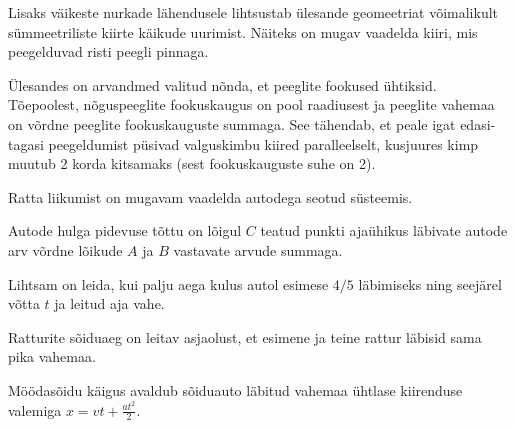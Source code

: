 \documentclass[10pt]{article}
\begin{document}
{
\hint
Lisaks väikeste nurkade lähendusele lihtsustab ülesande geomeetriat võimalikult sümmeetriliste kiirte käikude uurimist. Näiteks on mugav vaadelda kiiri, mis peegelduvad risti peegli pinnaga.
\probend
\bigskip


\hint
Ülesandes on arvandmed valitud nõnda, et peeglite fookused ühtiksid. Tõepoolest, nõguspeeglite fookuskaugus on pool raadiusest ja peeglite vahemaa on võrdne peeglite fookuskauguste summaga. See tähendab, et peale igat edasi-tagasi peegeldumist püsivad valguskimbu kiired paralleelselt, kusjuures kimp muutub 2 korda kitsamaks (sest fookuskauguste suhe on 2).
\probend
\bigskip


\hint
Ratta liikumist on mugavam vaadelda autodega seotud süsteemis.
\probend
\bigskip


\hint
Autode hulga pidevuse tõttu on lõigul $C$ teatud punkti ajaühikus läbivate autode arv võrdne lõikude $A$ ja $B$ vastavate arvude summaga.
\probend
\bigskip


\hint
Lihtsam on leida, kui palju aega kulus autol esimese $4/5$ läbimiseks ning seejärel võtta $t$ ja leitud aja vahe.
\probend
\bigskip


\hint
Ratturite sõiduaeg on leitav asjaolust, et esimene ja teine rattur läbisid sama pika vahemaa.
\probend
\bigskip


\hint
Möödasõidu käigus avaldub sõiduauto läbitud vahemaa ühtlase kiirenduse valemiga $x = vt + \frac{at^2}{2}$.
\probend
\bigskip

}
\end{document}
